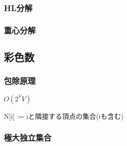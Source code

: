 \subsubsection{HL分解}


\subsubsection{重心分解}

\subsection{彩色数}
\subsubsection{包除原理}
$O(2^VV)$\par
N[i] := iと隣接する頂点の集合(iも含む)\par

\subsubsection{極大独立集合}

